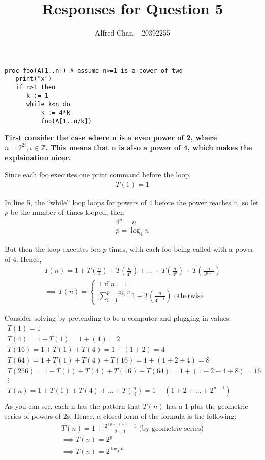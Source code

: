 \documentclass[12pt]{article}
\title{Responses for Question 5}
\author{Alfred Chan -- 20392255}
\begin{document}
\maketitle
\lstset{
	language=bash,
	numbers=left,
	showspaces=false,
	showstringspaces=false,
	stepnumber=1,
	basicstyle=\ttfamily,
	frame=single,
	breaklines=true,
	tabsize=2
}
\begin{lstlisting}
proc foo(A[1..n]) # assume n>=1 is a power of two
   print("x")
   if n>1 then
      k := 1
      while k<n do
          k := 4*k
          foo(A[1..n/k])
\end{lstlisting}

{\bf
First consider the case where n is a even power of 2, where $n = 2^{2i}, i \in \mathbb{Z}$. This means that n is also a power of 4, which makes the explaination nicer.

Since each foo executes one print command before the loop,
\begin{gather*}
T(1) = 1
\end{gather*}

In line 5, the ``while'' loop loops for powers of 4 before the power reaches n, so let $p$ be the number of times looped, then
\begin{gather*}
4^p = n\\
p = \log_{4} n
\end{gather*}

But then the loop executes foo $p$ times, with each foo being called with a power of 4. Hence,
\begin{gather*}
T(n) = 1  + T(\frac{n}{4}) + T(\frac{n}{4^2}) + \dots + T(\frac{n}{4^p}) + T(\frac{n}{4^{p-1}})\\
\implies 
T(n) = 
\begin{cases}
1 \text{ if } n =1\\
\sum_{i=1}^{p = \log_{4}n} 1 + T(\frac{n}{4^{i-1}}) \text{ otherwise}
\end{cases}
\end{gather*}

Consider solving by pretending to be a computer and plugging in values.
\begin{align*}
T(1) = 1\\
T(4) = 1 + T(1) = 1 + (1) = 2\\
T(16) = 1 + T(1) + T(4) = 1 + (1 + 2) = 4\\
T(64) = 1 + T(1) + T(4) + T(16) = 1 + (1 + 2 + 4)= 8\\
T(256) = 1 + T(1) + T(4) + T(16) + T(64)= 1 + (1 + 2 + 4 + 8)= 16\\
\vdots\\
T(n) = 1 + T(1) + T(4) + \dots + T(\frac{n}{4})= 1 + (1 + 2 + \dots +2^{p-1})\\
\end{align*}
As you can see, each n has the pattern that $T(n)$ has a 1 plus the geometric series of powers of 2s. Hence, a closed form of the formula is the following:
\begin{gather*}
T(n) = 1 + \frac{2^{(p-1)+1} - 1}{2-1} \text{ (by geometric series)}\\
\implies T(n) = 2^{p}\\
\implies T(n) = 2^{\log_{4}n}
\end{gather*}

}
\end{document}
